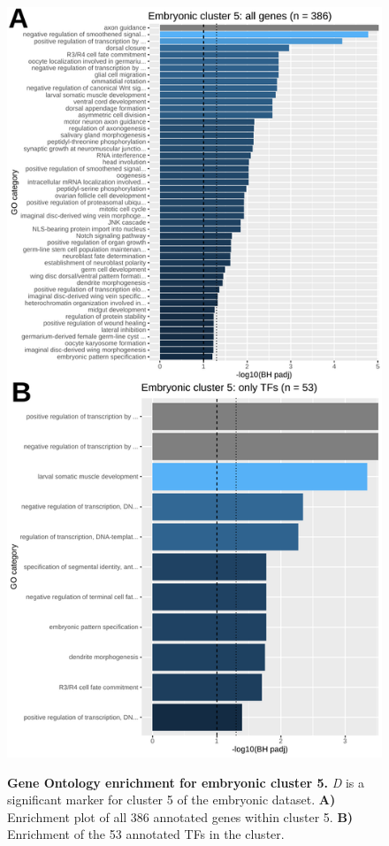 \documentclass[withindex,glossary]{cam-thesis}
\begin{document}
\setcounter{figure}{10-1}
\begin{figure}[htbp]
\centering
\includegraphics[height=\dimexpr\textheight-53.5pt\relax,keepaspectratio]{figs/Fig10 zinzen cluster 5.pdf}
\label{fig10}
\caption{\textbf{Gene Ontology enrichment for embryonic cluster 5.} \emph{D} is a significant marker for cluster 5 of the embryonic dataset. \textbf{A)} Enrichment plot of all 386 annotated genes within cluster 5. \textbf{B)} Enrichment of the 53 annotated TFs in the cluster.}
\end{figure}
\end{document}

